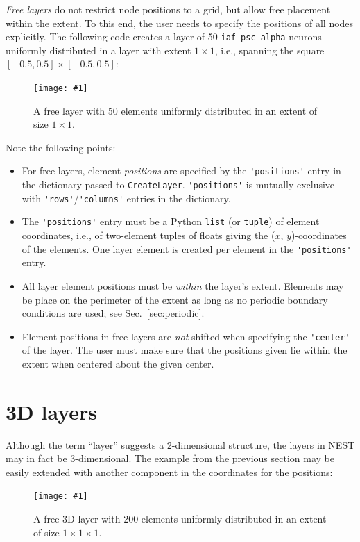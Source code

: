 \documentclass[a4paper,12pt]{report}
\newcommand{\scriptfig}[4]{%
\begin{figure}
\centerline{\texttt{[image: \#1]}}
\caption[#3]{#4}
\label{fig:#1}
\end{figure}%
}
\begin{document}
\emph{Free layers} do not restrict node positions to
a grid, but allow free placement within the extent. To this end, the
user needs to specify the positions of all nodes explicitly. The
following code creates a layer of 50 \lstinline!iaf_psc_alpha! neurons uniformly
distributed in a layer with extent $1\times 1$, i.e., spanning the
square $[-0.5,0.5]\times[-0.5,0.5]$:
%

\scriptfig{layer4}{0.5}{Layer with freely spaced elements.}%
{A free layer with 50 elements uniformly distributed in an extent of
size $1\times 1$.}
%
Note the following points:
\begin{itemize}
\item For free layers, element \emph{positions} are
  specified by the \lstinline!'positions'! entry in the dictionary
  passed to \lstinline!CreateLayer!. \lstinline!'positions'! is
  mutually exclusive with \lstinline!'rows'!/\lstinline!'columns'!
  entries in the dictionary.
\item The \lstinline!'positions'! entry must be a Python
  \lstinline!list! (or \lstinline!tuple!) of element coordinates,
  i.e., of two-element tuples of floats giving the ($x$, $y$)-coordinates
  of the elements. One layer element is created per element in the
  \lstinline!'positions'! entry.
\item All layer element positions must be \emph{within} the layer's
  extent. Elements may be place on the perimeter of the extent as long
  as no periodic boundary conditions are used; see Sec.~\ref{sec:periodic}.
\item Element positions in free layers are \emph{not} shifted when
  specifying the \lstinline!'center'! of the layer. The user must make
  sure that the positions given lie within the extent when centered
  about the given center.
\end{itemize}


\section{3D layers}\label{sec:3dlayer}

Although the term ``layer'' suggests a 2-dimensional structure, the layers
in NEST may in fact be 3-dimensional.  The example from
the previous section may be easily extended with another component in the
coordinates for the positions:
%

\scriptfig{layer4_3d}{0.5}{3D layer with freely spaced elements.}%
{A free 3D layer with 200 elements uniformly distributed in an extent of
size $1\times 1\times 1$.}
%
\end{document}
